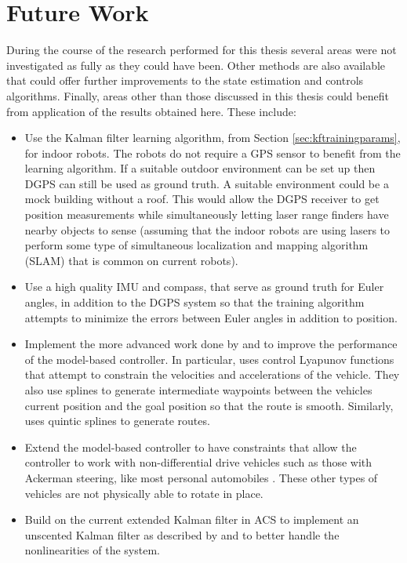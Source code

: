 \section{Future Work}
\label{sec:futureWork}
During the course of the research performed for this thesis several areas were not investigated as fully as they could have been. Other methods are also available that could offer further improvements to the state estimation and controls algorithms. Finally, areas other than those discussed in this thesis could benefit from application of the results obtained here. These include:
\begin{itemize}
\item Use the Kalman filter learning algorithm, from Section \ref{sec:kftrainingparams}, for indoor robots. The robots do not require a GPS sensor to benefit from the learning algorithm. If a suitable outdoor environment can be set up then DGPS can still be used as ground truth. A suitable environment could be a mock building without a roof. This would allow the DGPS receiver to get position measurements while simultaneously letting laser range finders have nearby objects to sense (assuming that the indoor robots are using lasers to perform some type of simultaneous localization and mapping algorithm (SLAM) that is common on current robots).
\item Use a high quality IMU and compass, that serve as ground truth for Euler angles, in addition to the DGPS system so that the training algorithm attempts to minimize the errors between Euler angles in addition to position.
\item Implement the more advanced work done by \cite{Lapierre06} and \cite{Gulati08} to improve the performance of the model-based controller. In particular, \cite{Gulati08} uses control Lyapunov functions that attempt to constrain the velocities and accelerations of the vehicle. They also use splines to generate intermediate waypoints between the vehicles current position and the goal position so that the route is smooth. Similarly, \cite{Burgard09} uses quintic splines to generate routes.
\item Extend the model-based controller to have constraints that allow the controller to work with non-differential drive vehicles such as those with Ackerman steering, like most personal automobiles \cite{Shiller91dynamicmotion}. These other types of vehicles are not physically able to rotate in place.
\item Build on the current extended Kalman filter in ACS to implement an unscented Kalman filter as described by \cite{ThrunProbRobots06} and \cite{Orderud05} to better handle the nonlinearities of the system.
\end{itemize}
